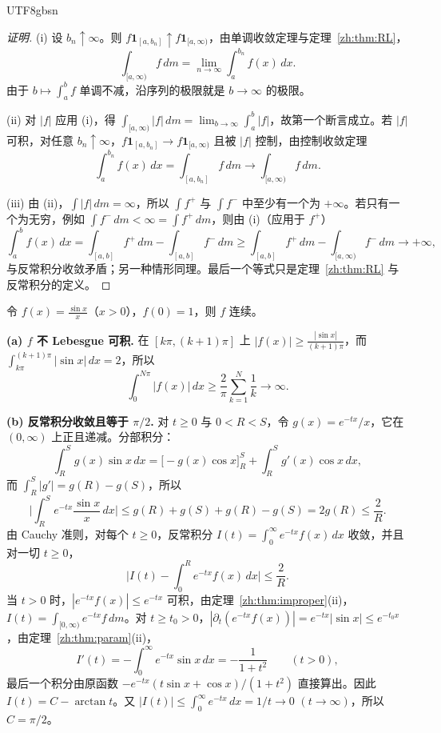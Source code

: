 \documentclass[11pt]{article}
\makeatletter
\newcommand{\envlabel}[1]{\protected@edef\@currentlabel{\themathenv}\label{#1}}
\makeatother
\begin{document}
\begin{CJK*}{UTF8}{gbsn}
\begin{proof}[证明]
(i) 设 $b_{n}\uparrow\infty$。则 $f\mathbf{1}_{[a,b_{n}]}\uparrow f\mathbf{1}_{[a,\infty)}$，由单调收敛定理与定理~\ref{zh:thm:RL}，
\[
\int_{[a,\infty)}f\,dm=\lim_{n\to\infty}\int_{a}^{b_{n}}f(x)\,dx.
\]
由于 $b\mapsto\int_{a}^{b}f$ 单调不减，沿序列的极限就是 $b\to\infty$ 的极限。

(ii) 对 $|f|$ 应用 (i)，得 $\int_{[a,\infty)}|f|\,dm=\lim_{b\to\infty}\int_{a}^{b}|f|$，故第一个断言成立。若 $|f|$ 可积，对任意 $b_{n}\uparrow\infty$，$f\mathbf{1}_{[a,b_{n}]}\to f\mathbf{1}_{[a,\infty)}$ 且被 $|f|$ 控制，由控制收敛定理
\[
\int_{a}^{b_{n}}f(x)\,dx=\int_{[a,b_{n}]}f\,dm\to\int_{[a,\infty)}f\,dm.
\]

(iii) 由 (ii)，$\int|f|\,dm=\infty$，所以 $\int f^{+}$ 与 $\int f^{-}$ 中至少有一个为 $+\infty$。若只有一个为无穷，例如 $\int f^{-}\,dm<\infty=\int f^{+}\,dm$，则由 (i)（应用于 $f^{+}$）
\[
\int_{a}^{b}f(x)\,dx=\int_{[a,b]}f^{+}\,dm-\int_{[a,b]}f^{-}\,dm\geq\int_{[a,b]}f^{+}\,dm-\int_{[a,\infty)}f^{-}\,dm\to+\infty,
\]
与反常积分收敛矛盾；另一种情形同理。最后一个等式只是定理~\ref{zh:thm:RL} 与反常积分的定义。
\end{proof}

\begin{example}\envlabel{zh:ex:sinc}
令 $f(x)=\frac{\sin x}{x}$（$x>0$），$f(0)=1$，则 $f$ 连续。

\textbf{(a) $f$ 不 Lebesgue 可积.} 在 $[k\pi,(k+1)\pi]$ 上 $|f(x)|\geq\frac{|\sin x|}{(k+1)\pi}$，而 $\int_{k\pi}^{(k+1)\pi}|\sin x|\,dx=2$，所以
\[
\int_{0}^{N\pi}|f(x)|\,dx\geq\frac{2}{\pi}\sum_{k=1}^{N}\frac1k\to\infty.
\]

\textbf{(b) 反常积分收敛且等于 $\pi/2$.} 对 $t\geq0$ 与 $0<R<S$，令 $g(x)=e^{-tx}/x$，它在 $(0,\infty)$ 上正且递减。分部积分：
\[
\int_{R}^{S}g(x)\sin x\,dx=\big[-g(x)\cos x\big]_{R}^{S}+\int_{R}^{S}g'(x)\cos x\,dx,
\]
而 $\int_{R}^{S}|g'|=g(R)-g(S)$，所以
\[
\Big|\int_{R}^{S}e^{-tx}\frac{\sin x}{x}\,dx\Big|\leq g(R)+g(S)+g(R)-g(S)=2g(R)\leq\frac{2}{R}.\tag{$\ast\ast$}
\]
由 Cauchy 准则，对每个 $t\geq0$，反常积分 $I(t)=\int_{0}^{\infty}e^{-tx}f(x)\,dx$ 收敛，并且对一切 $t\geq0$，
\[
\Big|I(t)-\int_{0}^{R}e^{-tx}f(x)\,dx\Big|\leq\frac2R.
\]
当 $t>0$ 时，$|e^{-tx}f(x)|\leq e^{-tx}$ 可积，由定理~\ref{zh:thm:improper}(ii)，$I(t)=\int_{[0,\infty)}e^{-tx}f\,dm$。对 $t\geq t_{0}>0$，$|\partial_{t}(e^{-tx}f(x))|=e^{-tx}|\sin x|\leq e^{-t_{0}x}$，由定理~\ref{zh:thm:param}(ii)，
\[
I'(t)=-\int_{0}^{\infty}e^{-tx}\sin x\,dx=-\frac{1}{1+t^{2}}\qquad(t>0),
\]
最后一个积分由原函数 $-e^{-tx}(t\sin x+\cos x)/(1+t^{2})$ 直接算出。因此 $I(t)=C-\arctan t$。又 $|I(t)|\leq\int_{0}^{\infty}e^{-tx}\,dx=1/t\to0$ $(t\to\infty)$，所以 $C=\pi/2$。


\end{example}
\end{CJK*}
\end{document}
